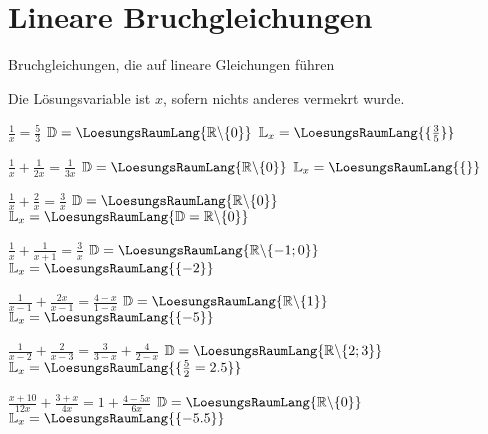 

\renewcommand{\bbwAufgabenBlockID}{GL\_Br}



\usepackage{amssymb} %
\renewcommand{\metaHeaderLine}{Arbeitsblatt}
\renewcommand{\arbeitsblattTitel}{Bruchgleichungen}

\arbeitsblattHeader{}

\section{Lineare Bruchgleichungen}
Bruchgleichungen, die auf lineare Gleichungen führen

Die Lösungsvariable ist $x$, sofern nichts anderes vermekrt wurde.


\begin{bbwAufgabenBlock}
\item $\frac1x = \frac53$     \hspace{10mm}              $\mathbb{D}= \LoesungsRaumLang{\mathbb{R}\backslash\{0\}}$    $\mathbb{L}_x = \LoesungsRaumLang{\{\frac35\}}$
\item $\frac1x + \frac1{2x} = \frac1{3x}$ \hspace{10mm}   $\mathbb{D}= \LoesungsRaumLang{\mathbb{R}\backslash\{0\}}$    $\mathbb{L}_x = \LoesungsRaumLang{\{\}}$
\item $\frac1x + \frac2x = \frac3x$  \hspace{10mm}       $\mathbb{D}= \LoesungsRaumLang{\mathbb{R}\backslash\{0\}}$    $\mathbb{L}_x = \LoesungsRaumLang{\mathbb{D}=\mathbb{R}\backslash\{0\}}$
\item $\frac1x + \frac1{x+1} = \frac3x$ \hspace{10mm}    $\mathbb{D}= \LoesungsRaumLang{\mathbb{R}\backslash\{-1;0\}}$ $\mathbb{L}_x = \LoesungsRaumLang{\{-2\}}$
\item $\frac1{x-1} + \frac{2x}{x-1} = \frac{4-x}{1-x}$ \hspace{10mm}    $\mathbb{D}= \LoesungsRaumLang{\mathbb{R}\backslash\{1\}}$ $\mathbb{L}_x = \LoesungsRaumLang{\{-5\}}$
\item $\frac1{x-2} + \frac{2}{x-3} = \frac3{3-x} + \frac{4}{2-x}$ \hspace{10mm}    $\mathbb{D}= \LoesungsRaumLang{\mathbb{R}\backslash\{2;3\}}$ $\mathbb{L}_x = \LoesungsRaumLang{\{\frac{5}{2}=2.5\}}$
\item $\frac{x+10}{12x} + \frac{3+x}{4x} = 1 + \frac{4-5x}{6x}$ \hspace{10mm}    $\mathbb{D}= \LoesungsRaumLang{\mathbb{R}\backslash\{0\}}$ $\mathbb{L}_x = \LoesungsRaumLang{\{-5.5\}}$
\end{bbwAufgabenBlock}

